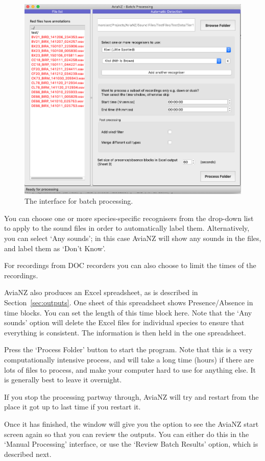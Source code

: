 \documentclass{article}
\begin{document}
\begin{figure}[h!]
\centering
\includegraphics[width=.5\textwidth]{Figs/Batch1}
\caption{The interface for batch processing.}
\label{batch}
\end{figure}

You can choose one or more species-specific recognisers from the drop-down list to apply to the sound files in order to automatically label them. Alternatively, you can select `Any sounds'; in this case AviaNZ will show any sounds in the files, and label them as `Don't Know'. 

For recordings from DOC recorders you can also choose to limit the times of the recordings. 

AviaNZ also produces an Excel spreadsheet, as is described in Section~\ref{sec:outputs}. One sheet of this spreadsheet shows Presence/Absence in time blocks. You can set the length of this time block here.
Note that the `Any sounds' option will delete the Excel files for individual species to ensure that everything is consistent. The information is then held in the one spreadsheet.  

Press the `Process Folder' button to start the program. Note that this is a very computationally intensive process, and will take a long time (hours) if there are lots of files to process, and make your computer hard to use for anything else. It is generally best to leave it overnight.

If you stop the processing partway through, AviaNZ will try and restart from the place it got up to last time if you restart it.

Once it has finished, the window will give you the option to see the AviaNZ start screen again so that you can review the outputs. You can either do this in the `Manual Processing' interface, or use the `Review Batch Results' option, which is described next. 
\end{document}
